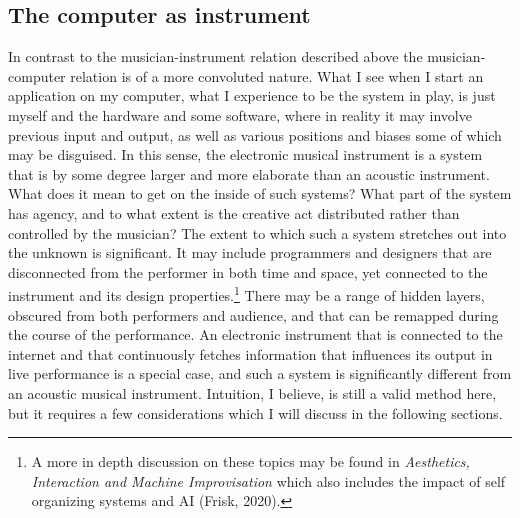 \documentclass[11pt]{article}
\makeatletter
\newcommand{\cslcitation}[2]
 {\protect\hyper@linkstart{cite}{citeproc_bib_item_#1}#2\hyper@linkend}
\makeatother
\begin{document}
\subsection*{The computer as instrument}
\label{sec:org1470c94}
In contrast to the musician-instrument relation described above the musician-computer relation is of a more convoluted nature.
What I see when I start an application on my computer, what I experience to be the system in play, is just myself and the hardware and some software, where in reality it may involve previous input and output, as well as various positions and biases some of which may be disguised.
In this sense, the electronic musical instrument is a system that is by some degree larger and more elaborate than an acoustic instrument.
What does it mean to get on the inside of such systems?
What part of the system has agency, and to what extent is the creative act distributed rather than controlled by the musician?
The extent to which such a system stretches out into the unknown is significant. 
It may include programmers and designers that are disconnected from the performer in both time and space, yet connected to the instrument and its design properties.\footnote{A more in depth discussion on these topics may be found in \emph{Aesthetics, Interaction and Machine Improvisation} which also includes the impact of self organizing systems and AI (\cslcitation{15}{Frisk, 2020}).}
There may be a range of hidden layers, obscured from both performers and audience, and that can be remapped during the course of the performance.
An electronic instrument that is connected to the internet and that continuously fetches information that influences its output in live performance is a special case, and such a system is significantly different from an acoustic musical instrument.
Intuition, I believe, is still a valid method here, but it requires a few considerations which I will discuss in the following sections.
\end{document}
